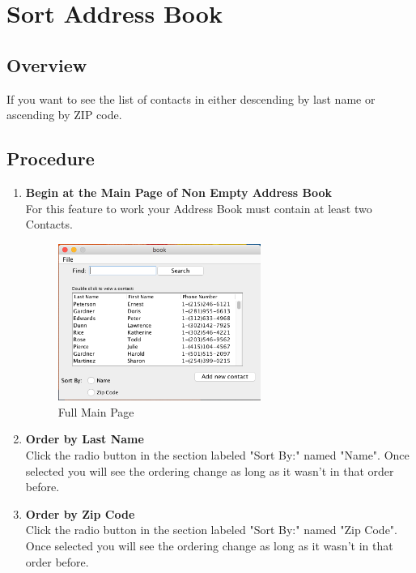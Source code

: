 \documentclass[a4paper, 11pt]{article}
\begin{document}
\clearpage

\section{Sort Address Book}
\subsection{Overview}
If you want to see the list of contacts in either descending by last name or ascending by ZIP code.
\subsection{Procedure}
\begin{enumerate}[label=\textbf{\arabic*})]
    \item{\textbf{Begin at the Main Page of Non Empty Address Book}}\\ For this feature to work your Address Book must contain at least two Contacts.
    
    \begin{figure}[h!]
    \centering
      \includegraphics[width=250]{main_page_full.png}
      \caption{Full Main Page}
    \end{figure}
    
    \item{\textbf{Order by Last Name}}\\ Click the radio button in the section labeled "Sort By:" named "Name". Once selected you will see the ordering change as long as it wasn't in that order before. 
    
    \item{\textbf{Order by Zip Code}}\\ Click the radio button in the section labeled "Sort By:" named "Zip Code". Once selected you will see the ordering change as long as it wasn't in that order before.
\end{enumerate}
\end{document}
